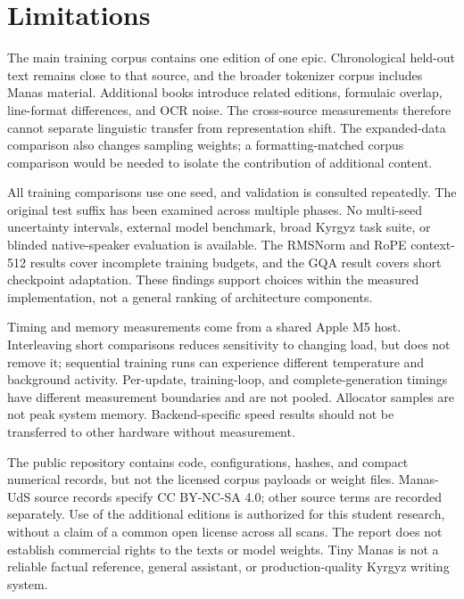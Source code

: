 \documentclass{article}
\begin{document}
\section{Limitations}
The main training corpus contains one edition of one epic. Chronological held-out text remains close to that source, and the broader tokenizer corpus includes Manas material. Additional books introduce related editions, formulaic overlap, line-format differences, and OCR noise. The cross-source measurements therefore cannot separate linguistic transfer from representation shift. The expanded-data comparison also changes sampling weights; a formatting-matched corpus comparison would be needed to isolate the contribution of additional content.

All training comparisons use one seed, and validation is consulted repeatedly. The original test suffix has been examined across multiple phases. No multi-seed uncertainty intervals, external model benchmark, broad Kyrgyz task suite, or blinded native-speaker evaluation is available. The RMSNorm and RoPE context-512 results cover incomplete training budgets, and the GQA result covers short checkpoint adaptation. These findings support choices within the measured implementation, not a general ranking of architecture components.

Timing and memory measurements come from a shared Apple M5 host. Interleaving short comparisons reduces sensitivity to changing load, but does not remove it; sequential training runs can experience different temperature and background activity. Per-update, training-loop, and complete-generation timings have different measurement boundaries and are not pooled. Allocator samples are not peak system memory. Backend-specific speed results should not be transferred to other hardware without measurement.

The public repository contains code, configurations, hashes, and compact numerical records, but not the licensed corpus payloads or weight files. Manas-UdS source records specify CC BY-NC-SA 4.0; other source terms are recorded separately. Use of the additional editions is authorized for this student research, without a claim of a common open license across all scans. The report does not establish commercial rights to the texts or model weights. Tiny Manas is not a reliable factual reference, general assistant, or production-quality Kyrgyz writing system.
\end{document}
